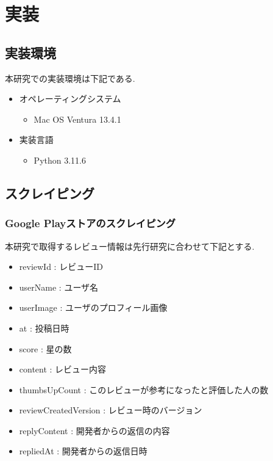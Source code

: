 \chapter{実装}
\label{chap:zisso}


\section{実装環境}
本研究での実装環境は下記である. 

\begin{itemize}
 \item オペレーティングシステム
    \begin{itemize}
      \item Mac OS Ventura 13.4.1
    \end{itemize}
 \item 実装言語
    \begin{itemize}
      \item Python 3.11.6
    \end{itemize}
\end{itemize}


\section{スクレイピング}\label{scraping}
\subsection{Google Playストアのスクレイピング}
本研究で取得するレビュー情報は先行研究\cite{kawatsura}に合わせて下記とする. 

\begin{itemize}
 \item reviewId : レビューID
 \item userName : ユーザ名
 \item userImage : ユーザのプロフィール画像
 \item at : 投稿日時
 \item score : 星の数
 \item content : レビュー内容
 \item thumbsUpCount : このレビューが参考になったと評価した人の数
 \item reviewCreatedVersion : レビュー時のバージョン
 \item replyContent : 開発者からの返信の内容
 \item repliedAt : 開発者からの返信日時
\end{itemize}

